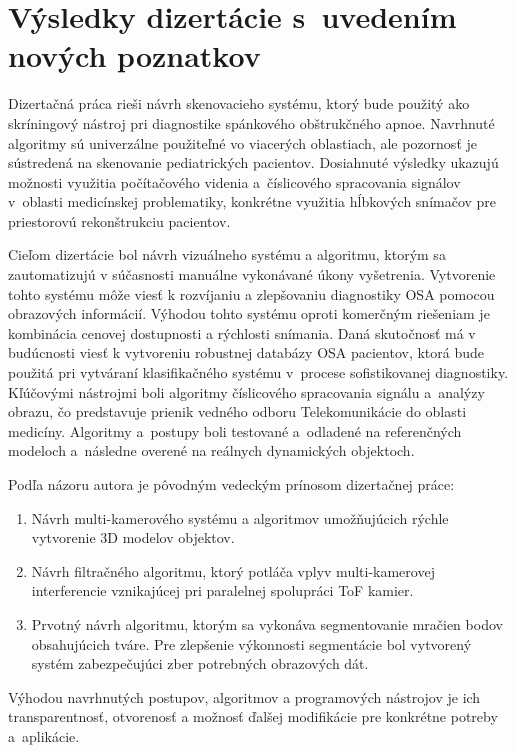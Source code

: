 \chapter{Výsledky dizertácie s uvedením nových poznatkov}

\pagestyle{fancy}
\fancyhf{}
\fancyfoot[CE,CO]{\thepage}


Dizertačná práca rieši návrh skenovacieho systému, ktorý bude použitý ako skríningový nástroj pri diagnostike spánkového obštrukčného apnoe. Navrhnuté algoritmy sú univerzálne použiteľné vo viacerých oblastiach, ale pozornosť je sústredená na skenovanie pediatrických pacientov. Dosiahnuté výsledky ukazujú možnosti využitia počítačového videnia a číslicového spracovania signálov v oblasti medicínskej problematiky, konkrétne využitia hĺbkových snímačov pre priestorovú rekonštrukciu pacientov. \newline  
 
Cieľom dizertácie bol návrh vizuálneho systému a algoritmu, ktorým sa zautomatizujú v súčasnosti manuálne vykonávané úkony vyšetrenia. Vytvorenie tohto systému môže viesť k rozvíjaniu a zlepšovaniu diagnostiky OSA pomocou obrazových informácií. Výhodou tohto systému oproti komerčným riešeniam je kombinácia cenovej dostupnosti a rýchlosti snímania. Daná skutočnosť má v budúcnosti viesť k vytvoreniu robustnej databázy OSA pacientov, ktorá bude použitá pri vytváraní klasifikačného systému v procese sofistikovanej diagnostiky. Kľúčovými nástrojmi boli algoritmy číslicového spracovania signálu a analýzy obrazu, čo predstavuje prienik vedného odboru Telekomunikácie do oblasti medicíny. Algoritmy a postupy boli testované a odladené na referenčných modeloch a následne overené na reálnych dynamických objektoch. \newpage 

\noindent Podľa názoru autora je pôvodným vedeckým prínosom dizertačnej práce:
\begin{enumerate}
	\item Návrh multi-kamerového systému a algoritmov umožňujúcich rýchle vytvorenie 3D modelov objektov.
	\item Návrh filtračného algoritmu, ktorý potláča vplyv multi-kamerovej interferencie vznikajúcej pri paralelnej spolupráci ToF kamier. 
	\item Prvotný návrh algoritmu, ktorým sa vykonáva segmentovanie mračien bodov obsahujúcich tváre. Pre zlepšenie výkonnosti segmentácie bol vytvorený systém zabezpečujúci zber potrebných obrazových dát.	
\end{enumerate}


Výhodou navrhnutých postupov, algoritmov a programových nástrojov je ich transparentnosť, otvorenosť a možnosť ďalšej modifikácie pre konkrétne potreby a aplikácie.

